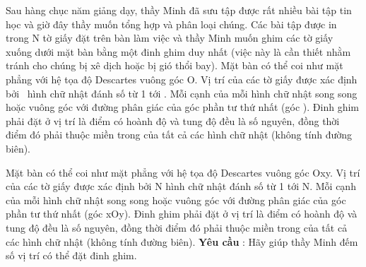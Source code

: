 Sau hàng chục năm giảng dạy, thầy Minh đã sưu tập được rất nhiều bài tập tin học và giờ đây thầy muốn tổng hợp và phân loại chúng. Các bài tập được in trong N tờ giấy đặt trên bàn làm việc và thầy Minh muốn ghim các tờ giấy xuống dưới mặt bàn bằng một đinh ghim duy nhất (việc này là cần thiết nhằm tránh cho chúng bị xê dịch hoặc bị gió thổi bay).       Mặt bàn có thể coi như mặt phẳng với hệ tọa độ Descartes vuông góc Ο. Vị trí của các tờ giấy được xác định bởi  hình chữ nhật đánh số từ 1 tới . Mỗi cạnh của mỗi hình chữ nhật song song hoặc vuông góc với đường phân giác của góc phần tư thứ nhất (góc ). Đinh ghim phải đặt ở vị trí là điểm có hoành độ và tung độ đều là số nguyên, đồng thời điểm đó phải thuộc miền trong của tất cả các hình chữ nhật (không tính đường biên).    

   Mặt bàn có thể coi như mặt phẳng với hệ tọa độ Descartes vuông góc Οxy. Vị trí của các tờ giấy được xác định bởi N hình chữ nhật đánh số từ 1 tới N. Mỗi cạnh của mỗi hình chữ nhật song song hoặc vuông góc với đường phân giác của góc phần tư thứ nhất (góc xOy). Đinh ghim phải đặt ở vị trí là điểm có hoành độ và tung độ đều là số nguyên, đồng thời điểm đó phải thuộc miền trong của tất cả các hình chữ nhật (không tính đường biên).  \textbf{    Yêu cầu   }   : Hãy giúp thầy Minh đếm số vị trí có thể đặt đinh ghim.